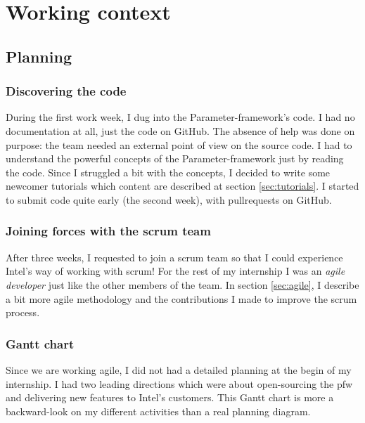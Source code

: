 \chapter{Working context}\label{chap:organisation}

\section{Planning}
\subsection{Discovering the code}
During the first work week, I dug into the Parameter-framework's code. I had no
documentation at all, just the code on \gls{GitHub}. The absence of help was done on
purpose: the team needed an external point of view on the source code. I had
to understand the powerful concepts of the Parameter-framework just by reading
the code. Since I struggled a bit with the concepts, I decided to write some
newcomer tutorials which content are described at section \ref{sec:tutorials}.
I started to submit code quite early (the second week), with \gls{pullrequests} on \gls{GitHub}.

\subsection{Joining forces with the scrum team}
After three weeks, I requested to join a \gls{scrum} team so that I could experience
Intel's way of working with \gls{scrum}!
For the rest of my internship I was an \emph{agile developer} just like the other members of the team.
In section \ref{sec:agile}, I describe a bit more agile methodology and the contributions I made to improve
the \gls{scrum} process.

\subsection{Gantt chart}
Since we are working agile, I did not had a detailed planning at the begin of my internship.
I had two leading directions which were about open-sourcing the \gls{pfw} and delivering new features
to Intel's customers.
This Gantt chart is more a backward-look on my different activities than a real planning
diagram.



